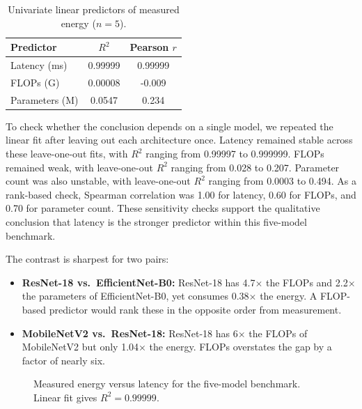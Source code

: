 \documentclass{svproc}
\begin{document}
\begin{table}[ht]
\centering
\caption{Univariate linear predictors of measured energy ($n = 5$).}
\label{tab:predictors}
\begin{tabular}{l c c}
\toprule
Predictor & $R^2$ & Pearson $r$ \\
\midrule
Latency (ms) & 0.99999 & 0.99999 \\
FLOPs (G) & 0.00008 & -0.009 \\
Parameters (M) & 0.0547 & 0.234 \\
\bottomrule
\end{tabular}
\end{table}

To check whether the conclusion depends on a single model, we repeated the
linear fit after leaving out each architecture once. Latency remained stable
across these leave-one-out fits, with $R^2$ ranging from 0.99997 to 0.999999.
FLOPs remained weak, with leave-one-out $R^2$ ranging from 0.028 to 0.207.
Parameter count was also unstable, with leave-one-out $R^2$ ranging from
0.0003 to 0.494. As a rank-based check, Spearman correlation was 1.00 for
latency, 0.60 for FLOPs, and 0.70 for parameter count. These sensitivity
checks support the qualitative conclusion that latency is the stronger
predictor within this five-model benchmark.

The contrast is sharpest for two pairs:
\begin{itemize}
\item \textbf{ResNet-18 vs.\ EfficientNet-B0:} ResNet-18 has 4.7$\times$ the
FLOPs and 2.2$\times$ the parameters of EfficientNet-B0, yet consumes
0.38$\times$ the energy. A FLOP-based predictor would rank these in the
opposite order from measurement.
\item \textbf{MobileNetV2 vs.\ ResNet-18:} ResNet-18 has 6$\times$ the FLOPs
of MobileNetV2 but only 1.04$\times$ the energy. FLOPs overstates the gap by a
factor of nearly six.
\end{itemize}

\begin{figure}[ht]
\centering
{}
\caption{Measured energy versus latency for the five-model benchmark. Linear fit gives $R^2 = 0.99999$.}
\label{fig:energy-vs-latency}
\end{figure}
\end{document}
